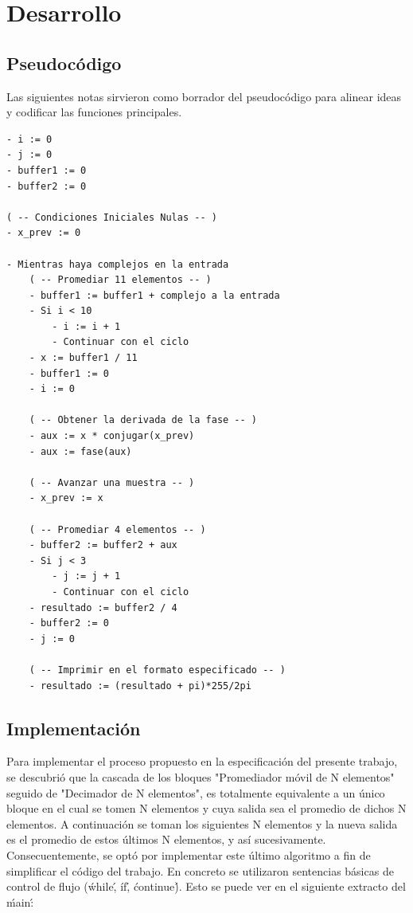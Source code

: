 \documentclass[10pt,a4paper]{article}
\begin{document}
\section{Desarrollo}
\subsection{Pseudocódigo}
Las siguientes notas sirvieron como borrador del pseudocódigo para alinear ideas y codificar las funciones principales.\\
\begin{verbatim}
- i := 0
- j := 0
- buffer1 := 0
- buffer2 := 0

( -- Condiciones Iniciales Nulas -- )
- x_prev := 0

- Mientras haya complejos en la entrada
	( -- Promediar 11 elementos -- )
	- buffer1 := buffer1 + complejo a la entrada
	- Si i < 10
		- i := i + 1
		- Continuar con el ciclo
	- x := buffer1 / 11
	- buffer1 := 0
	- i := 0

	( -- Obtener la derivada de la fase -- )
	- aux := x * conjugar(x_prev)
	- aux := fase(aux)

	( -- Avanzar una muestra -- )
	- x_prev := x

	( -- Promediar 4 elementos -- )
	- buffer2 := buffer2 + aux
	- Si j < 3
		- j := j + 1
		- Continuar con el ciclo
	- resultado := buffer2 / 4
	- buffer2 := 0
	- j := 0
	
	( -- Imprimir en el formato especificado -- )
	- resultado := (resultado + pi)*255/2pi 

\end{verbatim}
\subsection{Implementación}
Para implementar el proceso propuesto en la especificación del presente trabajo, se descubrió que la cascada de los bloques "Promediador móvil de N elementos" seguido de "Decimador de N elementos", es totalmente equivalente a un único bloque en el cual se tomen N elementos y cuya salida sea el promedio de dichos N elementos. A continuación se toman los siguientes N elementos y la nueva salida es el promedio de estos últimos N elementos, y así sucesivamente.\\

 Consecuentemente, se optó por implementar este último algoritmo a fin de simplificar el código del trabajo. En concreto se utilizaron sentencias básicas de control de flujo (\'while\', \'if\', \'continue\'). Esto se puede ver en el siguiente extracto del \'main\':
\end{document}

